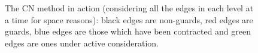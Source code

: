 \documentclass[review,a4paper]{elsarticle}
\newenvironment{stusubfig}[1]
{
	\begin{figure}[#1]
	\begin{center}
}
{
	\end{center}
	\end{figure}
}
\begin{document}
\begin{stusubfig}{p}
	\hspace{4mm}%
	\hspace{4mm}%
\caption[The CN method in action]{The CN method in action (considering all the edges in each level at a time for space reasons): black edges are non-guards, red edges are guards, blue edges are those which have been contracted and green edges are ones under active consideration.}
\label{fig:segmentation-waterfall-nicholls-example}
\end{stusubfig}
\end{document}
